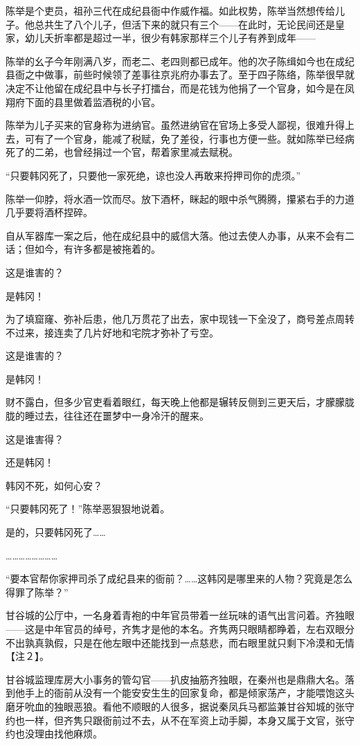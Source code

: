 陈举是个吏员，祖孙三代在成纪县衙中作威作福。如此权势，陈举当然想传给儿子。他总共生了八个儿子，但活下来的就只有三个——在此时，无论民间还是皇家，幼儿夭折率都是超过一半，很少有韩家那样三个儿子有养到成年——

陈举的幺子今年刚满八岁，而老二、老四则都已成年。他的次子陈缉如今也在成纪县衙之中做事，前些时候领了差事往京兆府办事去了。至于四子陈络，陈举很早就决定不让他留在成纪县中与长子打擂台，而是花钱为他捐了一个官身，如今是在凤翔府下面的县里做着监酒税的小官。

陈举为儿子买来的官身称为进纳官。虽然进纳官在官场上多受人鄙视，很难升得上去，可有了一个官身，能减了税赋，免了差役，行事也方便一些。就如陈举已经病死了的二弟，也曾经捐过一个官，帮着家里减去赋税。

“只要韩冈死了，只要他一家死绝，谅也没人再敢来捋押司你的虎须。”

陈举一仰脖，将水酒一饮而尽。放下酒杯，眯起的眼中杀气腾腾，攥紧右手的力道几乎要将酒杯捏碎。

自从军器库一案之后，他在成纪县中的威信大落。他过去使人办事，从来不会有二话；但如今，有许多都是被拖着的。

这是谁害的？

是韩冈！

为了填窟窿、弥补后患，他几万贯花了出去，家中现钱一下全没了，商号差点周转不过来，接连卖了几片好地和宅院才弥补了亏空。

这是谁害的？

是韩冈！

财不露白，但多少官吏看着眼红，每天晚上他都是辗转反侧到三更天后，才朦朦胧胧的睡过去，往往还在噩梦中一身冷汗的醒来。

这是谁害得？

还是韩冈！

韩冈不死，如何心安？

“只要韩冈死了！”陈举恶狠狠地说着。

是的，只要韩冈死了……

……………………

“要本官帮你家押司杀了成纪县来的衙前？……这韩冈是哪里来的人物？究竟是怎么得罪了陈举？”

甘谷城的公厅中，一名身着青袍的中年官员带着一丝玩味的语气出言问着。齐独眼——这是中年官员的绰号，齐隽才是他的本名。齐隽两只眼睛都睁着，左右双眼分不出孰真孰假，只是在他左眼中还能找到一点慈悲，而右眼里就只剩下冷漠和无情【注２】。

甘谷城监理库房大小事务的管勾官——扒皮抽筋齐独眼，在秦州也是鼎鼎大名。落到他手上的衙前从没有一个能安安生生的回家复命，都是倾家荡产，才能喂饱这头磨牙吮血的独眼恶狼。看他不顺眼的人很多，据说秦凤兵马都监兼甘谷知城的张守约也一样，但齐隽只跟衙前过不去，从不在军资上动手脚，本身又属于文官，张守约也没理由找他麻烦。

